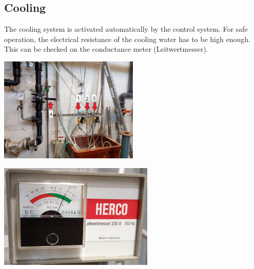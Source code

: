 \documentclass[fleqn,a4paper,20pt]{article}
\begin{document}
\subsection{Cooling}

The cooling system is activated automatically by the control system.
For safe operation, the electrical resistance of the cooling water has to be high enough. This can be checked on the conductance meter (Leitwertmesser).\\

\begin{minipage}{.5\textwidth}
	\centering
	\includegraphics[height=5cm]{Cool2}
\end{minipage}
\begin{minipage}{.5\textwidth}
	\centering
	\includegraphics[height=5cm]{Cool1}
\end{minipage}

\begin{minipage}{.4\textwidth}

\end{minipage}
\end{document}
